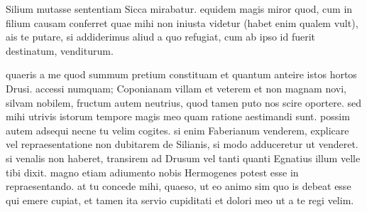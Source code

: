 


 Silium mutasse sententiam Sicca mirabatur. equidem magis miror quod, cum in filium causam conferret quae mihi non iniusta videtur (habet enim qualem vult), ais te putare, si addiderimus aliud a quo refugiat, cum ab ipso id fuerit destinatum, venditurum.

 quaeris a me quod summum pretium constituam et quantum anteire istos hortos Drusi. accessi numquam; Coponianam villam et veterem et non magnam novi, silvam nobilem, fructum autem neutrius, quod tamen puto nos scire oportere. sed mihi utrivis istorum tempore magis meo quam ratione aestimandi sunt. possim autem adsequi necne tu velim cogites. si enim Faberianum venderem, explicare vel repraesentatione non dubitarem de Silianis, si modo adduceretur ut venderet. si venalis non haberet, transirem ad Drusum vel tanti quanti Egnatius illum velle tibi dixit. magno etiam adiumento nobis Hermogenes potest esse in repraesentando. at tu concede mihi, quaeso, ut eo animo sim quo is debeat esse qui emere cupiat, et tamen ita servio cupiditati et dolori meo ut a te regi velim.
